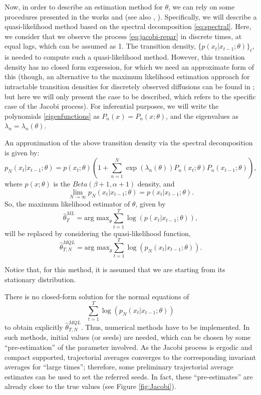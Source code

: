 \documentclass[12pt]{article}
\begin{document}
Now, in order to describe an estimation method for $\theta$, we can rely on some procedures  presented in the works \citep{gourieroux2004estimation} and \citep{valery2011quasi} (see also \citep{kessler1999estimating}, \citep{larsen2007diffusion}). Specifically, we will describe a quasi-likelihood method based on the spectral decomposition \eqref{eq:spectral}. Here, we consider that we  observe the process \eqref{eq:jacobi-repar} in discrete times, at equal lags, which can be assumed as 1. The transition density, $\{p(x_{t}|x_{t-1};\theta)\}_t$, is needed to compute such a quasi-likelihood method. However, this transition density has no closed form expression, for which we need an approximate form of this (though, an alternative to the maximum likelihood estimation approach for intractable transition densities for discretely observed diffusions can be found in
\citep{ait2002maximum}; but here we will only present the case to be described, which refers to the specific case of the Jacobi process). For inferential purposes, we will write the polynomials \eqref{eigenfunctions} as $P_n(x)=P_n(x;\theta)$, and the eigenvalues as $\lambda_n=\lambda_n(\theta)$.

An approximation of the above transition density via the spectral decomposition is given by:
\begin{equation}\label{spectral-app}
p_N(x_{t}|x_{t-1};\theta)=p(x_{t};\theta)\left(1+\sum_{n=1}^{N}\exp(\lambda_n(\theta))P_n(x_{t};\theta)P_n(x_{t-1};\theta)\right),
\end{equation}
where $p(x;\theta)$ is the $Beta(\beta+1,\alpha+1)$ density, and $$\lim_{N\rightarrow\infty}p_N(x_{t}|x_{t-1};\theta)=p(x_{t}|x_{t-1};\theta).$$ 
So, the maximum likelihood estimator of $\theta$, given by $$\hat{\theta}_{T}^{ML}=\text{arg max}_{\theta}\sum_{t=1}^{T}\log(p(x_{t}|x_{t-1};\theta)),$$ will be replaced by considering the quasi-likelihood function, $$\hat{\theta}_{T,N}^{MQL}=\text{arg max}_{\theta}\sum_{t=1}^{T}\log(p_N(x_{t}|x_{t-1};\theta)).$$

\begin{rem}
Notice that, for this method, it is assumed that we are starting from its stationary distribution.
\end{rem}


There is no closed-form solution for the normal equations of $$\sum_{t=1}^{T}\log(p_N(x_{t}|x_{t-1};\theta))$$ to obtain explicitly $\hat{\theta}_{T,N}^{MQL}$. Thus, numerical methods have to be implemented. In such methods, initial values (or seeds) are needed, which can be chosen by some ``pre-estimation'' of the parameter involved. As the Jacobi process is ergodic and compact supported, trajectorial averages converges to the corresponding invariant averages for ``large times''; therefore, some preliminary trajectorial average estimates can be used to set the referred seeds. In fact, these ``pre-estimates'' are already close to the true values (see Figure \ref{fig:Jacobi}).
\end{document}
